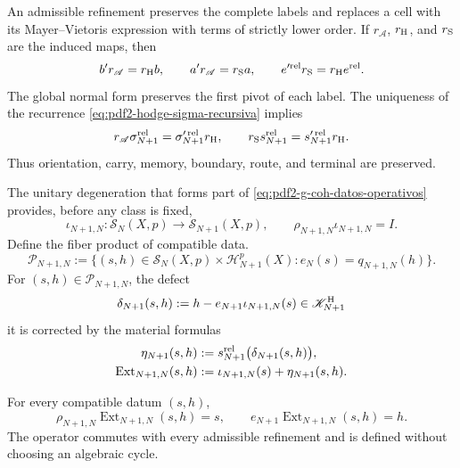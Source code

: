 An admissible refinement preserves the complete labels and replaces a
cell with its Mayer--Vietoris expression with terms of strictly
lower order. If $r_{\mathscr A}$, $r_{\rm H}$, and $r_{\rm S}$ are the
induced maps, then
\begin{equation}\label{eq:pdf2-hodge-entrelazadores-refinamiento}
 b' r_{\mathscr A}=r_{\rm H}b,
 \qquad
 a' r_{\mathscr A}=r_{\rm S}a,
 \qquad
 e'^{\rm rel}r_{\rm S}=r_{\rm H}e^{\rm rel}.
\end{equation}
The global normal form preserves the first pivot of each label. The
uniqueness of the recurrence \eqref{eq:pdf2-hodge-sigma-recursiva} implies
\begin{equation}\label{eq:pdf2-hodge-naturalidad}
 r_{\mathscr A}\sigma_{N+1}^{\rm rel}
 =\sigma_{N+1}^{\prime\,\rm rel}r_{\rm H},
 \qquad
 r_{\rm S}s_{N+1}^{\rm rel}
 =s_{N+1}^{\prime\,\rm rel}r_{\rm H}.
\end{equation}
Thus orientation, carry, memory, boundary, route, and terminal are preserved.

The unitary degeneration that forms part of
\eqref{eq:pdf2-g-coh-datos-operativos} provides, before any class is fixed,
\begin{equation}\label{eq:pdf2-hodge-extension-cero}
 \iota_{N+1,N}:\mathscr S_N(X,p)\longrightarrow\mathscr S_{N+1}(X,p),
 \qquad \rho_{N+1,N}\iota_{N+1,N}=I.
\end{equation}
Define the fiber product of compatible data.
\begin{equation}\label{eq:pdf2-hodge-pullback-extension}
 \mathscr P_{N+1,N}:=
 \{(s,h)\in\mathscr S_N(X,p)\times\mathscr H_{N+1}^p(X):
             e_N(s)=q_{N+1,N}(h)\}.
\end{equation}
For $(s,h)\in\mathscr P_{N+1,N}$, the defect
\begin{equation}\label{eq:pdf2-hodge-defecto-universal}
 \delta_{N+1}(s,h):=
 h-e_{N+1}\iota_{N+1,N}(s)
 \in\mathscr K^{\rm H}_{N+1}
\end{equation}
it is corrected by the material formulas
\begin{equation}\label{eq:pdf2-hodge-eta-extension}
 \begin{aligned}
  \eta_{N+1}(s,h)&:=
     s_{N+1}^{\rm rel}\bigl(\delta_{N+1}(s,h)\bigr),\\
  \operatorname{Ext}_{N+1,N}(s,h)&:=
     \iota_{N+1,N}(s)+\eta_{N+1}(s,h).
 \end{aligned}
\end{equation}

\begin{theorem}
\label{thm:pdf2-hodge-extension-universal}
For every compatible datum $(s,h)$,
\begin{equation}\label{eq:pdf2-hodge-dos-identidades-extension}
 \rho_{N+1,N}\operatorname{Ext}_{N+1,N}(s,h)=s,
 \qquad
 e_{N+1}\operatorname{Ext}_{N+1,N}(s,h)=h.
\end{equation}
The operator commutes with every admissible refinement and is defined without choosing an algebraic cycle.
\end{theorem}

